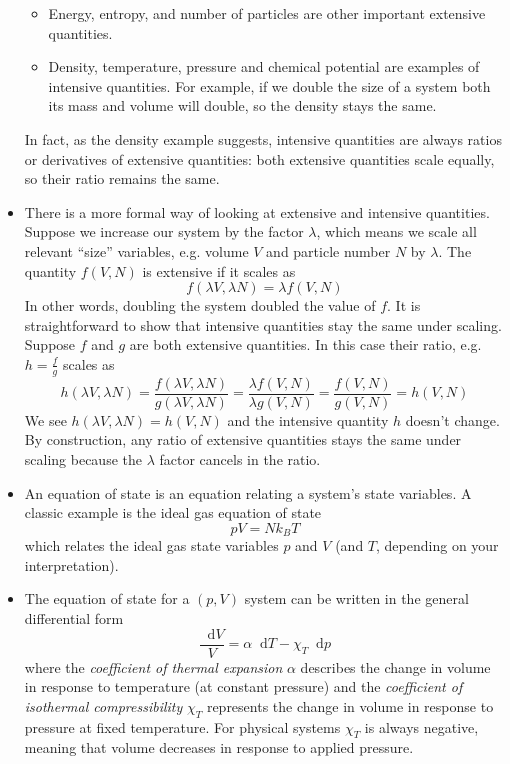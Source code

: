 \documentclass[11pt, a4paper]{article}
\newcommand{\diff}{\mathop{}\!\mathrm{d}} %
\begin{document}
\begin{itemize}
\begin{itemize}
		\item Energy, entropy, and number of particles are other important extensive quantities.
		
		\item Density, temperature, pressure and chemical potential are examples of intensive quantities. For example, if we double the size of a system both its mass and volume will double, so the density stays the same.
	\end{itemize}
	In fact, as the density example suggests, intensive quantities are always ratios or derivatives of extensive quantities: both extensive quantities scale equally, so their ratio remains the same.
	
	\item There is a more formal way of looking at extensive and intensive quantities. Suppose we increase our system by the factor $ \lambda $, which means we scale all relevant ``size'' variables, e.g. volume $ V $ and particle number $ N $ by $ \lambda $. The quantity $ f(V, N) $ is extensive if it scales as 
	\begin{equation*}
		f(\lambda V, \lambda N) = \lambda f(V, N)
	\end{equation*}
	In other words, doubling the system doubled the value of $ f $. It is straightforward to show that intensive quantities stay the same under scaling. Suppose $ f $ and $ g $ are both extensive quantities. In this case their ratio, e.g. $ h = \frac{f}{g} $ scales as
	\begin{equation*}
		h(\lambda V, \lambda N) = \frac{f(\lambda V, \lambda N)}{g(\lambda V, \lambda N)} = \frac{\lambda f(V, N)}{\lambda g(V, N)} = \frac{f(V, N)}{g(V, N)} = h(V, N)
	\end{equation*}
	We see $ h(\lambda V, \lambda N) = h(V, N) $ and the intensive quantity $ h $ doesn't change. By construction, any ratio of extensive quantities stays the same under scaling because the $ \lambda $ factor cancels in the ratio.
	
	\item An equation of state is an equation relating a system's state variables. A classic example is the ideal gas equation of state
	\begin{equation*}
		pV = Nk_{B}T
	\end{equation*}
	which relates the ideal gas state variables $ p $ and $ V $ (and $ T $, depending on your interpretation). 
	
	\item The equation of state for a $ (p, V) $ system can be written in the general differential form
	\begin{equation*}
		\frac{\diff V}{V} = \alpha \diff T - \chi_{T} \diff p
	\end{equation*}
	where the \textit{coefficient of thermal expansion} $ \alpha $ describes the change in volume in response to temperature (at constant pressure) and the \textit{coefficient of isothermal compressibility} $ \chi_{T} $ represents the change in volume in response to pressure at fixed temperature. For physical systems $ \chi_{T} $ is always negative, meaning that volume decreases in response to applied pressure.
\end{itemize}
 
\end{document}
